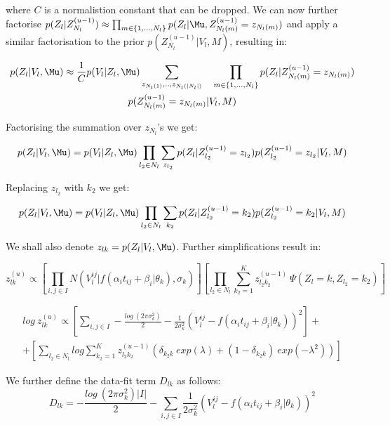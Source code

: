 where $C$ is a normalistion constant that can be dropped. We can now  further factorise $p(Z_l|Z_{N_l}^{(u-1)}) \approx  \prod_{m \in \{1, ..., N_l\}} p(Z_l | \Mu,  Z_{N_l(m)}^{(u-1)} = z_{N_l(m)})$ and apply a similar factorisation to the prior $p(Z_{N_l}^{(u-1)}|V_l, M) $, resulting in:

\begin{multline}
 p(Z_l | V_l, \Mu) \approx \frac{1}{C} p(V_l|Z_l, \Mu) \sum_{z_{N_l(1)}, .., z_{N_l(|N_l|)}}\ \ \  \prod_{m \in \{1, ..., N_l\}} p(Z_l | Z_{N_l(m)}^{(u-1)} = z_{N_l(m)}) \\ p(Z_{N_l(m)}^{(u-1)} = z_{N_l(m)}|V_l, M)
\end{multline}


Factorising the summation over $z_{N_l}$'s we get:

\begin{equation}
 p(Z_l | V_l, \Mu) = p(V_l| Z_l, \Mu)   \prod_{l_2 \in N_l} \sum_{z_{l_2}} p(Z_l | Z_{l_2}^{(u-1)} = z_{l_2}) p(Z_{l_2}^{(u-1)} = z_{l_2}|V_l, M)
\end{equation}

Replacing $z_{l_2}$ with $k_2$ we get:

\begin{equation}
 p(Z_l | V_l, \Mu) = p(V_l| Z_l, \Mu)   \prod_{l_2 \in N_l} \sum_{k_2} p(Z_l | Z_{l_2}^{(u-1)} = k_2) p(Z_{l_2}^{(u-1)} = k_2|V_l, M)
\end{equation}


We shall also denote $z_{lk} = p(Z_l | V_l, \Mu)$. Further simplifications result in:

\begin{equation}
 z_{lk}^{(u)} \propto  \left[ \prod_{i,j \in I} N(V_l^{ij} | f(\alpha_i t_{ij} + \beta_i | \theta_k), \sigma_k) \right] \left[ \prod_{l_2 \in N_l} \sum_{k_2 = 1}^K z_{l_2k_2}^{(u-1)}\ \Psi (Z_{l} = k, Z_{l_2} = k_2) \right]
\end{equation}


\begin{multline}
 log\ z_{lk}^{(u)} \propto  \left[ \sum_{i,j \in I} -\frac{log\ (2 \pi \sigma_k^2)}{2} - \frac{1}{2\sigma_k^2}(V_l^{ij} - f(\alpha_i t_{ij} + \beta_i | \theta_k))^2 \right] + \\ + \left[\sum_{l_2 \in N_l} log \sum_{k_2 = 1}^K z_{l_2k_2}^{(u-1)} (\delta_{k_2 k}\ exp(\lambda) + (1 - \delta_{k_2 k})\ exp(-\lambda^2)) \right]
\end{multline}


We further define the data-fit term $D_{lk}$ as follows:
\begin{equation}
\label{eq:app_e-step_Dlk}
D_{lk} = -\frac{log\ (2 \pi \sigma_k^2) |I|}{2} - \sum_{i,j \in I}  \frac{1}{2\sigma_k^2}(V_l^{ij} - f(\alpha_i t_{ij} + \beta_i | \theta_k))^2 
\end{equation}


